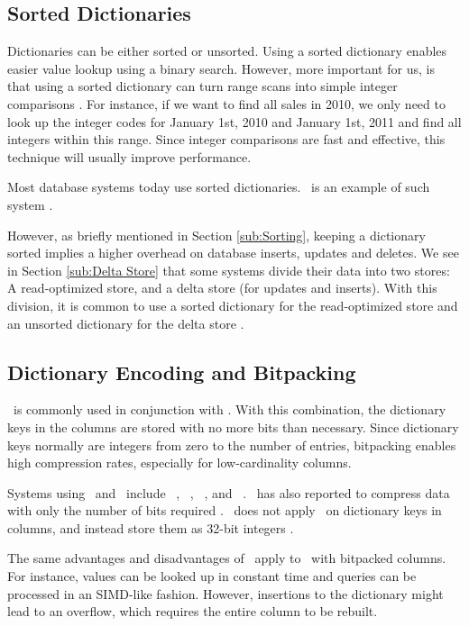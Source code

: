 \subsection{Sorted Dictionaries}
\label{sub:Sorted Dictionaries}
Dictionaries can be either sorted or unsorted. Using a sorted dictionary enables easier value lookup using a binary search. However, more important for us, is that using a sorted dictionary can turn range scans into simple integer comparisons \cite{Faust2015-ke}. For instance, if we want to find all sales in 2010, we only need to look up the integer codes for January 1st, 2010 and January 1st, 2011 and find all integers within this range. Since integer comparisons are fast and effective, this technique will usually improve performance. 

Most database systems today use sorted dictionaries. \saph~is an example of such system \cite{Farber2012-vh}.

However, as briefly mentioned in Section \ref{sub:Sorting}, keeping a dictionary sorted implies a higher overhead on database inserts, updates and deletes. We see in Section \ref{sub:Delta Store} that some systems divide their data into two stores: A read-optimized store, and a delta store (for updates and inserts). With this division, it is common to use a sorted dictionary for the read-optimized store and an unsorted dictionary for the delta store \cite{Plattner2014-fr}.

\subsection{Dictionary Encoding and Bitpacking}
\label{sub:Dictionary Encoding and Bitpacking}
\de~is commonly used in conjunction with \bp. With this combination, the dictionary keys in the columns are stored with no more bits than necessary. Since dictionary keys normally are integers from zero to the number of entries, bitpacking enables high compression rates, especially for low-cardinality columns.

Systems using \de~and \bp~include \ibm~\cite{Raman2013-em}, \blink~\cite{Barber2012-xt}, \sapnw~\cite{Willhalm2009-hu}, and \saph~\cite{Psaroudakis2014-ma}. \qlikview~has also reported to compress data with only the number of bits required \cite{Qlik2014-vd}. \mssql~does not apply \bp~on dictionary keys in columns, and instead store them as 32-bit integers \cite{Larson2013-mc}.

The same advantages and disadvantages of \bp~apply to \de~with bitpacked columns. For instance, values can be looked up in constant time and queries can be processed in an SIMD-like fashion. However, insertions to the dictionary might lead to an overflow, which requires the entire column to be rebuilt.

